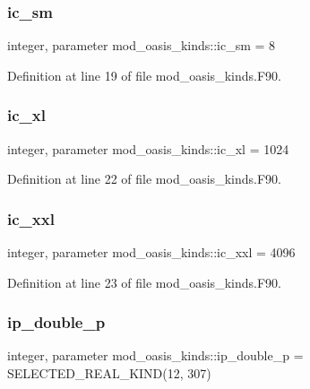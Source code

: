 \subsubsection{\texorpdfstring{ic\+\_\+sm}{ic\_sm}}
{\footnotesize\ttfamily integer, parameter mod\+\_\+oasis\+\_\+kinds\+::ic\+\_\+sm = 8}



Definition at line 19 of file mod\+\_\+oasis\+\_\+kinds.\+F90.

\mbox{\label{namespacemod__oasis__kinds_a8da8fcfc62bc8c67614f998f57e7e3fc}} 
\subsubsection{\texorpdfstring{ic\+\_\+xl}{ic\_xl}}
{\footnotesize\ttfamily integer, parameter mod\+\_\+oasis\+\_\+kinds\+::ic\+\_\+xl = 1024}



Definition at line 22 of file mod\+\_\+oasis\+\_\+kinds.\+F90.

\mbox{\label{namespacemod__oasis__kinds_a9e7a6d15a336c2bfdadd42213a73f113}} 
\subsubsection{\texorpdfstring{ic\+\_\+xxl}{ic\_xxl}}
{\footnotesize\ttfamily integer, parameter mod\+\_\+oasis\+\_\+kinds\+::ic\+\_\+xxl = 4096}



Definition at line 23 of file mod\+\_\+oasis\+\_\+kinds.\+F90.

\mbox{\label{namespacemod__oasis__kinds_aff0b6e4604e7a60178eeca47edec1460}} 
\subsubsection{\texorpdfstring{ip\+\_\+double\+\_\+p}{ip\_double\_p}}
{\footnotesize\ttfamily integer, parameter mod\+\_\+oasis\+\_\+kinds\+::ip\+\_\+double\+\_\+p = S\+E\+L\+E\+C\+T\+E\+D\+\_\+\+R\+E\+A\+L\+\_\+\+K\+I\+ND(12, 307)}




